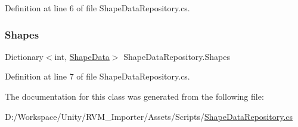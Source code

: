 Definition at line 6 of file Shape\+Data\+Repository.\+cs.

\mbox{\label{class_shape_data_repository_a3db12e581c70b38a9f2631ea345e2a68}} 
\subsubsection{\texorpdfstring{Shapes}{Shapes}}
{\footnotesize\ttfamily Dictionary$<$int, \mbox{\hyperlink{class_shape_data}{Shape\+Data}}$>$ Shape\+Data\+Repository.\+Shapes}



Definition at line 7 of file Shape\+Data\+Repository.\+cs.



The documentation for this class was generated from the following file\+:\begin{DoxyCompactItemize}
\item 
D\+:/\+Workspace/\+Unity/\+R\+V\+M\+\_\+\+Importer/\+Assets/\+Scripts/\mbox{\hyperlink{_shape_data_repository_8cs}{Shape\+Data\+Repository.\+cs}}\end{DoxyCompactItemize}
